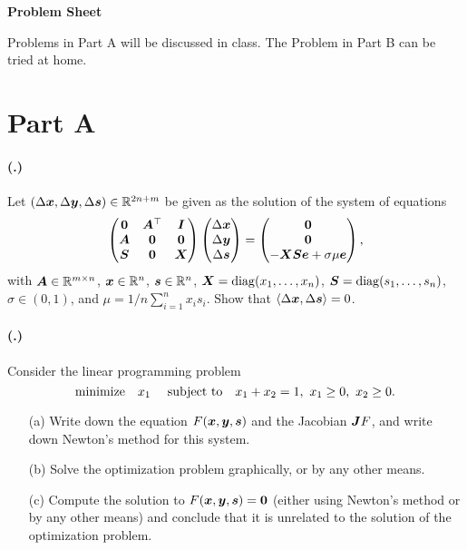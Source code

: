 \documentclass{article}
\newcounter{problemSheetNumber}
\newcounter{problems}
\renewcommand{\problem}{\paragraph{(\theproblemSheetNumber.\theproblems)}\addtocounter{problems}{1}}
\begin{document}
 
\begin{center}
{\Large {\bf Problem Sheet \theproblemSheetNumber}}
\end{center}

Problems in Part A will be discussed in class. The Problem in Part B can be tried at home.


\section*{Part A}

\problem Let $(\Delta \bm{x},\Delta \bm{y},\Delta \bm{s})\in \mathbb{R}^{2n+m}$ be given as the solution 
of the system of equations
\begin{equation*}
 \begin{pmatrix}
  \bm{0} & \bm{A}^{\top} & \bm{I} \\
  \bm{A} & \bm{0} & \bm{0} \\
  \bm{S} & \bm{0} & \bm{X}
 \end{pmatrix}
\begin{pmatrix} \Delta\bm{x}\\ \Delta \bm{y}\\ \Delta\bm{s} \end{pmatrix} = \begin{pmatrix} \bm{0} \\ \bm{0} \\ -\bm{X}\bm{S}\bm{e}+\sigma \mu\bm{e}\end{pmatrix},
\end{equation*}
with $\bm{A}\in \mathbb{R}^{m\times n}$, $\bm{x}\in \mathbb{R}^n$, $\bm{s}\in \mathbb{R}^n$, $\bm{X}=\mathrm{diag}(x_1,\dots,x_n)$, $\bm{S}=\mathrm{diag}(s_1,\dots,s_n)$, $\sigma\in (0,1)$, and $\mu=1/n \sum_{i=1}^n x_is_i$.
Show that $\langle {\Delta\bm{x}}, {\Delta\bm{s}} \rangle=0$.

\problem Consider the linear programming problem
\begin{equation*}
 \minimize x_1 \ \subjto x_1+x_2=1, \ x_1\geq 0, \ x_2\geq 0.
\end{equation*}
\begin{itemize}
 \item[(a)] Write down the equation $F(\bm{x},\bm{y},\bm{s})$ and the Jacobian $\bm{J}F$, and write down Newton's method for this system.
 \item[(b)] Solve the optimization problem graphically, or by any other means.
 \item[(c)] Compute the solution to $F(\bm{x},\bm{y},\bm{s})=\bm{0}$ (either using Newton's method or by any other means) and conclude that it is unrelated to the solution of the optimization problem.
\end{itemize}
\end{document}
